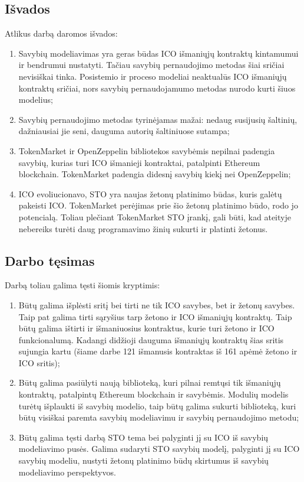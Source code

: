 \documentclass{VUMIFPSbakalaurinis}
\begin{document}

\subsection*{Išvados}

Atlikus darbą daromos išvados:
\begin{enumerate}[topsep=0pt,itemsep=-1ex,partopsep=1ex,parsep=1ex]
\item Savybių modeliavimas yra geras būdas ICO išmaniųjų kontraktų kintamumui ir bendrumui nustatyti. Tačiau savybių pernaudojimo metodas šiai sričiai nevisiškai tinka.  Posistemio ir proceso modeliai neaktualūs ICO išmaniųjų kontraktų sričiai, nors savybių pernaudojamumo metodas nurodo kurti šiuos modelius;
\item Savybių pernaudojimo metodas tyrinėjamas mažai: nedaug susijusių šaltinių, dažniausiai jie seni, dauguma autorių šaltiniuose sutampa;
\item TokenMarket ir OpenZeppelin bibliotekos savybėmis nepilnai padengia savybių, kurias turi ICO išmanieji kontraktai, patalpinti Ethereum blockchain. TokenMarket padengia didesnį savybių kiekį nei OpenZeppelin;
\item ICO evoliucionavo, STO yra naujas žetonų platinimo būdas, kuris galėtų pakeisti ICO. TokenMarket perėjimas prie šio žetonų platinimo būdo, rodo jo potencialą. Toliau plečiant TokenMarket STO įrankį, gali būti, kad ateityje nebereiks turėti daug programavimo žinių sukurti ir platinti žetonus.
\end{enumerate}

\subsection*{Darbo tęsimas}

Darbą toliau galima tęsti šiomis kryptimis:
\begin{enumerate}[topsep=0pt,itemsep=-1ex,partopsep=1ex,parsep=1ex]
\item Būtų galima išplėsti sritį bei tirti ne tik ICO savybes, bet ir žetonų savybes. Taip pat galima tirti sąryšius tarp žetono ir ICO išmaniųjų kontraktų. Taip būtų galima ištirti ir išmaniuosius kontraktus, kurie turi žetono ir ICO funkcionalumą. Kadangi didžioji dauguma išmaniųjų kontraktų šias sritis sujungia kartu (šiame darbe 121 išmanusis kontraktas iš 161 apėmė žetono ir ICO sritis);
\item Būtų galima pasiūlyti naują biblioteką, kuri pilnai remtųsi tik išmaniųjų kontraktų, patalpintų Ethereum blockchain ir savybėmis. Modulių modelis turėtų išplaukti iš savybių modelio, taip būtų galima sukurti biblioteką, kuri būtų visiškai paremta savybių modeliavimu ir savybių pernaudojimo metodu;
\item Būtų galima tęsti darbą STO tema bei palyginti jį su ICO iš savybių modeliavimo pusės. Galima sudaryti STO savybių modelį, palyginti jį su ICO savybių modeliu, nustyti žetonų platinimo būdų skirtumus iš savybių modeliavimo perspektyvos.
\end{enumerate}
\end{document}
